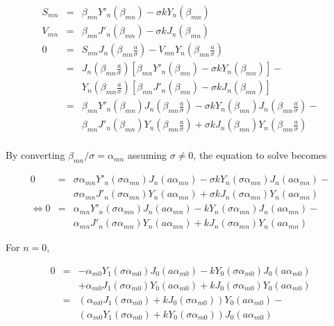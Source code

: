 \documentclass{article}
\begin{document}
\begin{eqnarray}
    S_{mn} &=& \beta_{mn}Y'_n(\beta_{mn}) - \sigma kY_n(\beta_{mn}) \\
    V_{mn} &=& \beta_{mn}J'_n(\beta_{mn}) - \sigma kJ_n(\beta_{mn}) \\
    0      &=& S_{mn} J_n\left(\beta_{mn}\frac{a}{\sigma}\right) -
               V_{mn} Y_n\left(\beta_{mn}\frac{a}{\sigma}\right) \\
           &=& J_n\left(\beta_{mn}\frac{a}{\sigma}\right)
                  \left[\beta_{mn}Y'_n(\beta_{mn}) - \sigma kY_n(\beta_{mn})\right] - \\
           & & Y_n\left(\beta_{mn}\frac{a}{\sigma}\right)
                  \left[\beta_{mn}J'_n(\beta_{mn}) - \sigma kJ_n(\beta_{mn})\right] \\
           &=& \beta_{mn}Y'_n(\beta_{mn})J_n\left(\beta_{mn}\frac{a}{\sigma}\right) -
               \sigma k   Y_n(\beta_{mn})J_n\left(\beta_{mn}\frac{a}{\sigma}\right) -\\
           & & \beta_{mn}J'_n(\beta_{mn})Y_n\left(\beta_{mn}\frac{a}{\sigma}\right) +
               \sigma k   J_n(\beta_{mn})Y_n\left(\beta_{mn}\frac{a}{\sigma}\right) \\
\end{eqnarray}

By converting $\beta_{mn} / \sigma = \alpha_{mn}$ assuming $\sigma \ne 0$, the equation to solve becomes

\begin{eqnarray}
    0 &=& \sigma \alpha_{mn}Y'_n(\sigma\alpha_{mn})J_n(a\alpha_{mn}) -
          \sigma k           Y_n(\sigma\alpha_{mn})J_n(a\alpha_{mn}) -\\
      & & \sigma \alpha_{mn}J'_n(\sigma\alpha_{mn})Y_n(a\alpha_{mn}) +
          \sigma k           J_n(\sigma\alpha_{mn})Y_n(a\alpha_{mn}) \\
\Leftrightarrow
    0 &=&        \alpha_{mn}Y'_n(\sigma\alpha_{mn})J_n(a\alpha_{mn}) -
                 k           Y_n(\sigma\alpha_{mn})J_n(a\alpha_{mn}) -\\
      & &        \alpha_{mn}J'_n(\sigma\alpha_{mn})Y_n(a\alpha_{mn}) +
                 k           J_n(\sigma\alpha_{mn})Y_n(a\alpha_{mn})
\end{eqnarray}

For $n = 0$,

\begin{eqnarray}
    0 &=& -\alpha_{m0}Y_1(\sigma\alpha_{m0})J_0(a\alpha_{m0}) -
          k           Y_0(\sigma\alpha_{m0})J_0(a\alpha_{m0}) \\
      & & +\alpha_{m0}J_1(\sigma\alpha_{m0})Y_0(a\alpha_{m0}) +
          k           J_0(\sigma\alpha_{m0})Y_0(a\alpha_{m0}) \\
      &=& (\alpha_{m0}J_1(\sigma\alpha_{m0}) + kJ_0(\sigma\alpha_{m0}))Y_0(a\alpha_{m0}) -\\
      & & (\alpha_{m0}Y_1(\sigma\alpha_{m0}) + kY_0(\sigma\alpha_{m0}))J_0(a\alpha_{m0})
\end{eqnarray}
\end{document}

